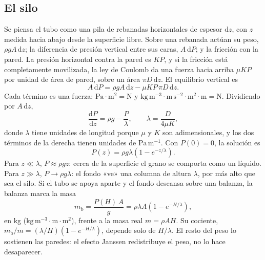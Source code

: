 \documentclass[11pt,a4paper]{article}
\begin{document}
\subsection{El silo}\label{sec:silo}

Se piensa el tubo como una pila de rebanadas horizontales de espesor $\mathrm{d}z$, con $z$ medida hacia abajo desde la superficie libre. Sobre una rebanada actúan su peso, $\rho g A\,\mathrm{d}z$; la diferencia de presión vertical entre sus caras, $A\,\mathrm{d}P$; y la fricción con la pared. La presión horizontal contra la pared es $KP$, y si la fricción está completamente movilizada, la ley de Coulomb da una fuerza hacia arriba $\mu K P$ por unidad de área de pared, sobre un área $\pi D\,\mathrm{d}z$. El equilibrio vertical es
\begin{equation}\label{eq:rebanada}
A\,\mathrm{d}P = \rho g A\,\mathrm{d}z - \mu K P\,\pi D\,\mathrm{d}z .
\end{equation}
Cada término es una fuerza: $\mathrm{Pa\cdot m^2} = \mathrm{N}$ y $\mathrm{kg\,m^{-3}\cdot m\,s^{-2}\cdot m^2\cdot m} = \mathrm{N}$. Dividiendo por $A\,\mathrm{d}z$,
\begin{equation}\label{eq:janssen-dif}
\frac{\mathrm{d}P}{\mathrm{d}z} = \rho g - \frac{P}{\lambda}, \qquad \lambda = \frac{D}{4\mu K},
\end{equation}
donde $\lambda$ tiene unidades de longitud porque $\mu$ y $K$ son adimensionales, y los dos términos de la derecha tienen unidades de $\mathrm{Pa\,m^{-1}}$. Con $P(0) = 0$, la solución es
\begin{equation}\label{eq:janssen}
P(z) = \rho g \lambda \left(1 - e^{-z/\lambda}\right).
\end{equation}
Para $z \ll \lambda$, $P \approx \rho g z$: cerca de la superficie el grano se comporta como un líquido. Para $z \gg \lambda$, $P \to \rho g \lambda$: el fondo «ve» una columna de altura $\lambda$, por más alto que sea el silo. Si el tubo se apoya aparte y el fondo descansa sobre una balanza, la balanza marca la masa
\begin{equation}\label{eq:balanza}
m_{\mathrm{b}} = \frac{P(H)\,A}{g} = \rho \lambda A \left(1 - e^{-H/\lambda}\right),
\end{equation}
en kg ($\mathrm{kg\,m^{-3}\cdot m\cdot m^2}$), frente a la masa real $m = \rho A H$. Su cociente, $m_{\mathrm{b}}/m = (\lambda/H)(1 - e^{-H/\lambda})$, depende solo de $H/\lambda$. El resto del peso lo sostienen las paredes: el efecto Janssen redistribuye el peso, no lo hace desaparecer.
\end{document}
